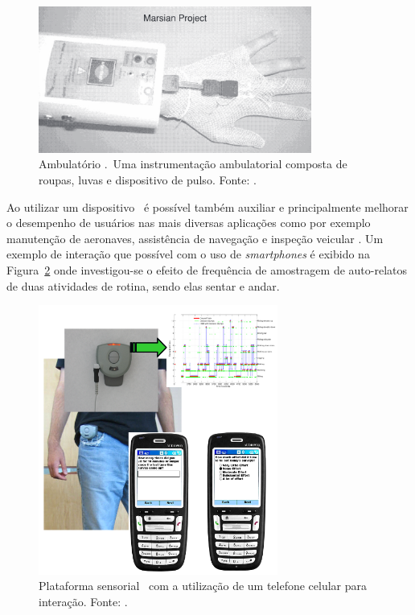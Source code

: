         \begin{figure}[h] \centering
            \includegraphics[width=0.8\textwidth]{img/rb-health.png}
            \caption{Ambulatório \Wearable.\ Uma instrumentação ambulatorial composta de roupas, luvas e dispositivo de pulso. Fonte: \citet{lmberis2007advanced}.}
            \label{fig:health}
        \end{figure}
    
        Ao utilizar um dispositivo \wearable\ é possível também auxiliar e principalmente melhorar o desempenho de usuários nas mais diversas aplicações como por exemplo manutenção de aeronaves, assistência de navegação e inspeção veicular \citep{billinghurst1999wearable}.
        Um exemplo de interação que possível com o uso de \textit{smartphones} é exibido na Figura~\ref{fig:rb-routine} onde investigou-se o efeito de
        frequência de amostragem de auto-relatos de duas atividades de rotina, sendo elas sentar e andar.
        
        \begin{figure}[h] \centering
            \includegraphics[width=0.7\textwidth]{img/rb-routine.png}
            \caption{Plataforma sensorial \wearable\ com a utilização de um telefone celular para interação. Fonte: \citet{Klasnja:2008:UWS:1409635.1409656}.}
            \label{fig:rb-routine}
        \end{figure}
        
